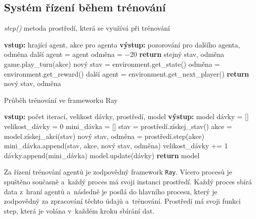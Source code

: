 \subsection{Systém řízení během trénování}

\begin{algorithm}[H]
  \caption{\emph{step()} metoda prostředí, která se využívá při trénování}
  \label{alg:step}
  \begin{algorithmic}
    \State \textbf{vstup:} hrající agent, akce pro agenta
    \State \textbf{výstup:} pozorování pro dalšího agenta, odměna
    \State
    \State další agent = agent
    \State odměna = $\minus$20
    \State \textbf{return} stejný stav, odměna
    \EndIf
    \State game.play\_turn(akce)
    \State nový stav = environment.get\_state()
    \State odměna = environment.get\_reward()
    \State další agent = environment.get\_next\_player()
    \State \textbf{return} nový stav, odměna
  \end{algorithmic}
\end{algorithm}

\begin{algorithm}[H]
  \caption{Průběh trénování ve frameworku Ray}
  \label{alg:training}
  \begin{algorithmic}
    \State \textbf{vstup:} počet iterací, velikost dávky, prostředí, model
    \State \textbf{výstup:} model
    \State
    \State dávky = []
        \State velikost\_dávky = 0
        \State mini\_dávka = []
          \State stav = prostředí.získej\_stav()
          \State akce = model.získej\_akci(stav)
          \State nový stav, odměna = prostředí.step(akce)
          \State mini\_dávka.append(stav, akce, nový stav, odměna)
          \State velikost\_dávky += 1
        \EndWhile
        \State dávky.append(mini\_dávka)
      \EndFor 
      \State model.update(dávky)
    \EndFor
    \State \textbf{return} model
  \end{algorithmic}
\end{algorithm}


Za řízení trénování agentů je zodpovědný framework \texttt{Ray}.
Vícero procesů je spuštěno současně a~každý proces má svoji instanci prostředí.
Každý proces sbírá data z~hraní agentů a~následně je posílá do hlavního procesu, který je zodpovědný za zpracování těchto údajů a~trénování.
Prostředí má svoji funkci step, která je volána v~každém kroku sbírání dat.

